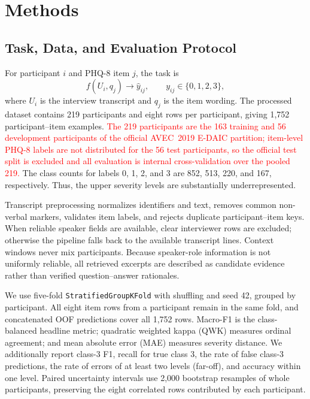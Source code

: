 \documentclass{article}
\DeclareRobustCommand{\rev}[1]{\textcolor{red}{#1}}
\begin{document}
\section{Methods}
\label{sec:methods}

\subsection{Task, Data, and Evaluation Protocol}
\label{subsec:data-eval}
For participant $i$ and PHQ-8 item $j$, the task is
\begin{equation}
  f(U_i,q_j) \rightarrow \hat{y}_{ij}, \qquad y_{ij}\in\{0,1,2,3\},
\end{equation}
where $U_i$ is the interview transcript and $q_j$ is the item wording. The processed dataset contains 219 participants and eight rows per participant, giving 1,752 participant--item examples. \rev{The 219 participants are the 163 training and 56 development participants of the official AVEC~2019 E-DAIC partition; item-level PHQ-8 labels are not distributed for the 56 test participants, so the official test split is excluded and all evaluation is internal cross-validation over the pooled 219.} The class counts for labels 0, 1, 2, and 3 are 852, 513, 220, and 167, respectively. Thus, the upper severity levels are substantially underrepresented.

Transcript preprocessing normalizes identifiers and text, removes common non-verbal markers, validates item labels, and rejects duplicate participant--item keys. When reliable speaker fields are available, clear interviewer rows are excluded; otherwise the pipeline falls back to the available transcript lines. Context windows never mix participants. Because speaker-role information is not uniformly reliable, all retrieved excerpts are described as candidate evidence rather than verified question--answer rationales.

We use five-fold \texttt{StratifiedGroupKFold} with shuffling and seed 42, grouped by participant. All eight item rows from a participant remain in the same fold, and concatenated OOF predictions cover all 1,752 rows. Macro-F1 is the class-balanced headline metric; quadratic weighted kappa (QWK) measures ordinal agreement; and mean absolute error (MAE) measures severity distance. We additionally report class-3 F1, recall for true class 3, the rate of false class-3 predictions, the rate of errors of at least two levels (far-off), and accuracy within one level. Paired uncertainty intervals use 2,000 bootstrap resamples of whole participants, preserving the eight correlated rows contributed by each participant.
\end{document}
